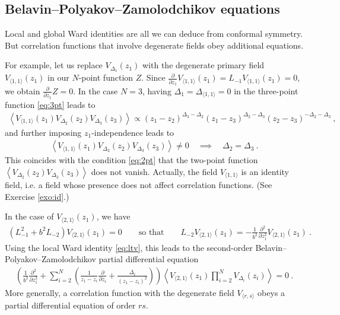 \documentclass[12pt, a4paper]{article}
\theoremstyle{break}
\begin{document}
\subsection{Belavin--Polyakov--Zamolodchikov equations}

Local and global Ward identities are all we can deduce from conformal symmetry. But correlation functions that involve degenerate fields obey additional equations. 

For example, let us replace $V_{\Delta_1}(z_1)$ with the degenerate primary field $V_{\langle 1, 1 \rangle}(z_1)$
in our $N$-point function $Z$. Since $\frac{\partial}{\partial z_1} V_{\langle 1, 1 \rangle}(z_1) = L_{-1} V_{\langle 1, 1 \rangle}(z_1) =0$,
we obtain $\frac{\partial}{\partial z_1} Z =0$. 
In the case $N=3$, having $\Delta_1=\Delta_{\langle 1,1\rangle}=0$ in the three-point function \eqref{eq:3pt} leads to
\begin{align}
 \left< V_{\langle 1, 1 \rangle}(z_1) V_{\Delta_2}(z_2) V_{\Delta_3}(z_3) \right> \propto (z_1-z_2)^{\Delta_3-\Delta_2} (z_1-z_3)^{\Delta_2-\Delta_3} (z_2-z_3)^{-\Delta_2-\Delta_3}\ , 
\end{align}
and further imposing $z_1$-independence leads to 
\begin{align}
 \left< V_{\langle 1, 1 \rangle}(z_1) V_{\Delta_2}(z_2) V_{\Delta_3}(z_3) \right> \neq 0 \quad \implies \quad \Delta_2=\Delta_3\ .
 \label{eq:vvvnz}
\end{align}
This coincides with the condition \eqref{eq:2pt} that the two-point function $\left<V_{\Delta_2}(z_2)V_{\Delta_3}(z_3)\right>$ does not vanish. Actually, the field $V_{\langle 1,1\rangle}$ is an identity field, i.e. a field whose presence does not affect correlation functions. (See Exercise \ref{exo:id}.)

In the case of $V_{\langle 2, 1 \rangle}(z_1)$, we have  
\begin{align}
\left(L_{-1}^2 + b^2 L_{-2}\right) V_{\langle 2, 1 \rangle}(z_1)  = 0\qquad \text{so that} \qquad L_{-2}V_{\langle 2, 1 \rangle}(z_1) = -\frac{1}{b^2}\frac{\partial^2}{\partial z_1^2} V_{\langle 2, 1 \rangle}(z_1)\ .
\end{align}
Using the local Ward identity \eqref{eq:ltv},
this leads to the second-order Belavin--Polyakov--Zamolodchikov partial differential equation
\begin{align}
 \left( \frac{1}{b^2}\frac{\partial^2}{\partial z_1^2} + \sum_{i=2}^N\left(\frac{1}{z_1-z_i}\frac{\partial}{\partial z_i} +\frac{\Delta_i}{(z_1-z_i)^2}\right) \right)\left< V_{\langle 2, 1 \rangle}(z_1) \prod_{i=2}^N V_{\Delta_i}(z_i) \right>  = 0\ .
 \label{eq:bpz}
\end{align}
More generally, a correlation function with the degenerate field $V_{\langle r,s\rangle}$ obeys a partial differential equation of order $rs$. 
\end{document}

